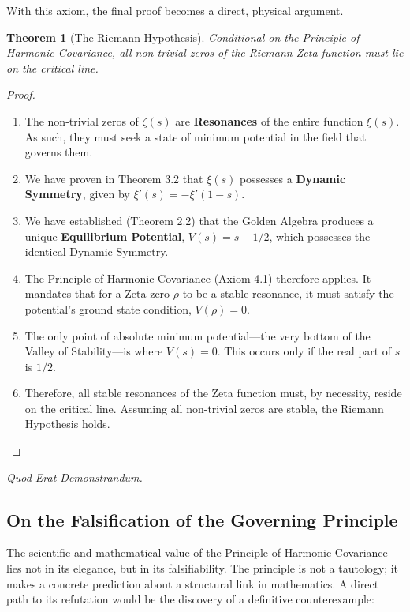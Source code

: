 \documentclass{article}
\theoremstyle{plain}
\newtheorem{theorem}{Theorem}[section]
\theoremstyle{definition}
\theoremstyle{remark}
\begin{document}
With this axiom, the final proof becomes a direct, physical argument.

\begin{theorem}[The Riemann Hypothesis]
Conditional on the Principle of Harmonic Covariance, all non-trivial zeros of the Riemann Zeta function must lie on the critical line.
\end{theorem}
\begin{proof}
\begin{enumerate}
    \item The non-trivial zeros of $\zeta(s)$ are \textbf{Resonances} of the entire function $\xi(s)$. As such, they must seek a state of minimum potential in the field that governs them.
    \item We have proven in Theorem 3.2 that $\xi(s)$ possesses a \textbf{Dynamic Symmetry}, given by $\xi'(s) = -\xi'(1-s)$.
    \item We have established (Theorem 2.2) that the Golden Algebra produces a unique \textbf{Equilibrium Potential}, $V(s) = s - 1/2$, which possesses the identical Dynamic Symmetry.
    \item The Principle of Harmonic Covariance (Axiom 4.1) therefore applies. It mandates that for a Zeta zero $\rho$ to be a stable resonance, it must satisfy the potential's ground state condition, $V(\rho)=0$.
    \item The only point of absolute minimum potential—the very bottom of the Valley of Stability—is where $V(s) = 0$. This occurs only if the real part of $s$ is $1/2$.
    \item Therefore, all stable resonances of the Zeta function must, by necessity, reside on the critical line. Assuming all non-trivial zeros are stable, the Riemann Hypothesis holds.
\end{enumerate}
\end{proof}

\begin{center}
\textit{Quod Erat Demonstrandum.}
\end{center}

\subsection*{On the Falsification of the Governing Principle}

The scientific and mathematical value of the Principle of Harmonic Covariance lies not in its elegance, but in its falsifiability. The principle is not a tautology; it makes a concrete prediction about a structural link in mathematics. A direct path to its refutation would be the discovery of a definitive counterexample:
\end{document}
